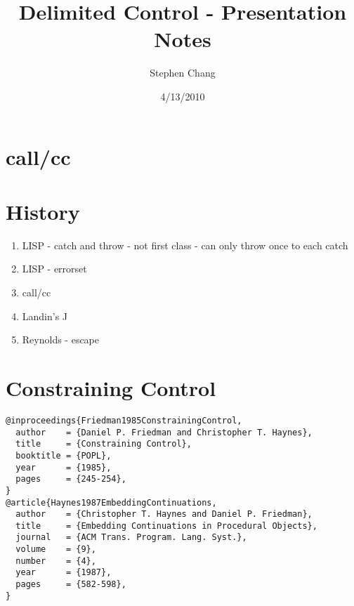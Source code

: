 \documentclass[letterpaper]{llncs}
\begin{document}

\title{Delimited Control - Presentation Notes}
\author{Stephen Chang}
\institute{}
\date{4/13/2010}
\maketitle

\section*{call/cc}

\section*{History}

\begin{enumerate}
	\item LISP - catch and throw - not first class - can only throw once to each catch
	\item LISP - errorset
	\item call/cc
	\item Landin's J
	\item Reynolds - escape
\end{enumerate}

\section*{Constraining Control}%

\begin{verbatim}
@inproceedings{Friedman1985ConstrainingControl,
  author    = {Daniel P. Friedman and Christopher T. Haynes},
  title     = {Constraining Control},
  booktitle = {POPL},
  year      = {1985},
  pages     = {245-254},
}
@article{Haynes1987EmbeddingContinuations,
  author    = {Christopher T. Haynes and Daniel P. Friedman},
  title     = {Embedding Continuations in Procedural Objects},
  journal   = {ACM Trans. Program. Lang. Syst.},
  volume    = {9},
  number    = {4},
  year      = {1987},
  pages     = {582-598},
}
\end{verbatim}
\end{document}
